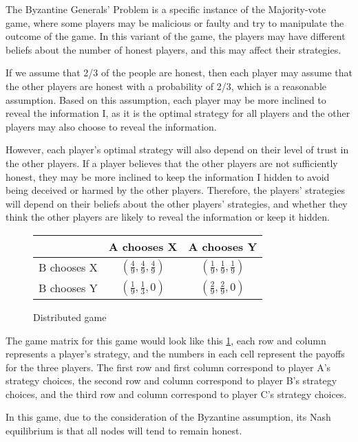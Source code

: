 \documentclass[twocolumn]{article}
\begin{document}
The Byzantine Generals' Problem is a specific instance of the Majority-vote game, where some players may be malicious or faulty and try to manipulate the outcome of the game. In this variant of the game, the players may have different beliefs about the number of honest players, and this may affect their strategies.

If we assume that 2/3 of the people are honest, then each player may assume that the other players are honest with a probability of 2/3, which is a reasonable assumption. Based on this assumption, each player may be more inclined to reveal the information I, as it is the optimal strategy for all players and the other players may also choose to reveal the information.

However, each player's optimal strategy will also depend on their level of trust in the other players. If a player believes that the other players are not sufficiently honest, they may be more inclined to keep the information I hidden to avoid being deceived or harmed by the other players. Therefore, the players' strategies will depend on their beliefs about the other players' strategies, and whether they think the other players are likely to reveal the information or keep it hidden.

\begin{figure}[htbp]
  \begin{center}
\begin{tabular}{c|cc}
& A chooses X & A chooses Y \\
\hline
B chooses X & $(\frac{4}{9}, \frac{4}{9}, \frac{4}{9})$ & $(\frac{1}{9}, \frac{1}{9}, \frac{1}{9})$ \\
B chooses Y & $(\frac{1}{9}, \frac{1}{3}, 0)$ & $(\frac{2}{9}, \frac{2}{9}, 0)$ \\
\end{tabular}
\end{center}
\label{dgame}
\caption{Distributed game}
\end{figure}

The game matrix for this game would look like this \ref{dgame}, each row and column represents a player's strategy, and the numbers in each cell represent the payoffs for the three players. The first row and first column correspond to player A's strategy choices, the second row and column correspond to player B's strategy choices, and the third row and column correspond to player C's strategy choices.

In this game, due to the consideration of the Byzantine assumption, its Nash equilibrium is that all nodes will tend to remain honest.
\end{document}
